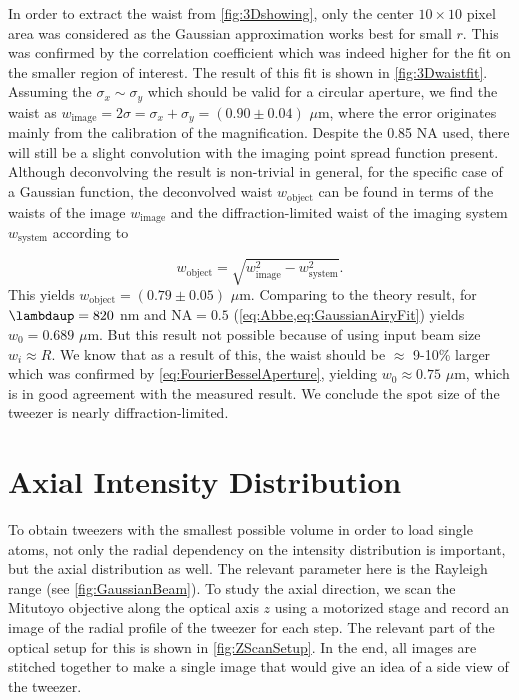 In order to extract the waist from \cref{fig:3Dshowing}, only the center $10 \times 10$ pixel area was considered as the Gaussian approximation works best for small $r$. 
This was confirmed by the correlation coefficient which was indeed higher for the fit on the smaller region of interest. 
The result of this fit is shown in \cref{fig:3Dwaistfit}.
Assuming the $\sigma_x \sim \sigma_y$ which should be valid for a circular aperture, we find the waist as $w_{\text{image}} = 2\sigma = \sigma_x + \sigma_y = (0.90 \pm 0.04)$ $\mu$m, where the error originates mainly from the calibration of the magnification. 
Despite the 0.85 NA used, there will still be a slight convolution with the imaging point spread function present. 
Although deconvolving the result is non-trivial in general, for the specific case of a Gaussian function, the deconvolved waist $w_{\text{object}}$ can be found in terms of the waists of the image $w_{\text{image}}$ and the diffraction-limited waist of the imaging system $w_{\text{system}}$ according to \cite{Knottnerus2018}

\begin{equation}\label{eq:Deconvolution}
    w_{\text{object}} = \sqrt{w_{\text{image}}^2-w_{\text{system}}^2}.
\end{equation}
This yields $w_{\text{object}} = (0.79 \pm 0.05)$ $\mu$m. 
Comparing to the theory result, for $\lambdaup = 820$ nm and $\text{NA} = 0.5$ (\cref{eq:Abbe,eq:GaussianAiryFit}) yields $w_0 = 0.689$ $\mu$m. 
But this result not possible because of using input beam size $w_i \approx R$. 
We know that as a result of this, the waist should be $\approx$ 9-10\% larger \cite{Chon2007,Sortais2007} which was confirmed by \cref{eq:FourierBesselAperture}, yielding $w_0 \approx 0.75$ $\mu$m, which is in good agreement with the measured result.
We conclude the spot size of the tweezer is nearly diffraction-limited.

\section{Axial Intensity Distribution}\label{sec:Tweezer3D}

To obtain tweezers with the smallest possible volume in order to load single atoms, not only the radial dependency on the intensity distribution is important, but the axial distribution as well.
The relevant parameter here is the Rayleigh range (see \cref{fig:GaussianBeam}).
To study the axial direction, we scan the Mitutoyo objective along the optical axis $z$ using a motorized stage and record an image of the radial profile of the tweezer for each step.
The relevant part of the optical setup for this is shown in \cref{fig:ZScanSetup}.
In the end, all images are stitched together to make a single image that would give an idea of a side view of the tweezer.

